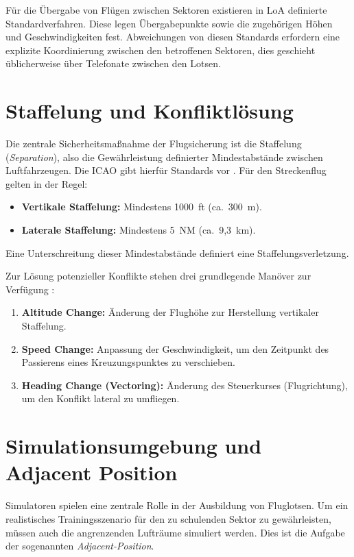 Für die Übergabe von Flügen zwischen Sektoren existieren in \ac{LoA} definierte Standardverfahren.
Diese legen Übergabepunkte sowie die zugehörigen Höhen und Geschwindigkeiten fest.
Abweichungen von diesen Standards erfordern eine explizite Koordinierung zwischen den betroffenen Sektoren, dies geschieht üblicherweise über Telefonate zwischen den Lotsen.

\section{Staffelung und Konfliktlösung}
Die zentrale Sicherheitsmaßnahme der Flugsicherung ist die Staffelung (\textit{Separation}), also die Gewährleistung definierter Mindestabstände zwischen Luftfahrzeugen.
Die \ac{ICAO} gibt hierfür Standards vor \cite{separation_standards}. Für den Streckenflug gelten in der Regel:
\begin{itemize}
    \item \textbf{Vertikale Staffelung:} Mindestens 1000~ft (ca.~300~m).
    \item \textbf{Laterale Staffelung:} Mindestens 5~NM (ca.~9,3~km).
\end{itemize}
Eine Unterschreitung dieser Mindestabstände definiert eine Staffelungsverletzung.
\medskip

Zur Lösung potenzieller Konflikte stehen drei grundlegende Manöver zur Verfügung \cite{CHEN2023104367}:
\begin{enumerate}
    \item \textbf{Altitude Change:} Änderung der Flughöhe zur Herstellung vertikaler Staffelung.
    \item \textbf{Speed Change:} Anpassung der Geschwindigkeit, um den Zeitpunkt des Passierens eines Kreuzungspunktes zu verschieben.
    \item \textbf{Heading Change (Vectoring):} Änderung des Steuerkurses (Flugrichtung), um den Konflikt lateral zu umfliegen.
\end{enumerate}

\section{Simulationsumgebung und Adjacent Position}
Simulatoren spielen eine zentrale Rolle in der Ausbildung von Fluglotsen.
Um ein realistisches Trainingsszenario für den zu schulenden Sektor zu gewährleisten, müssen auch die angrenzenden Lufträume simuliert werden.
Dies ist die Aufgabe der sogenannten \textit{Adjacent\hyp{}Position}.

